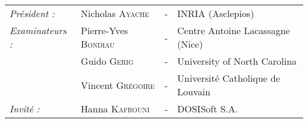 \begin{titlepage}
\begin{center}
\begin{tabular}{llcl}
      \textit{Président :}	& Nicholas \textsc{Ayache}		& - & INRIA (Asclepios)\\
      \textit{Examinateurs :}   & Pierre-Yves \textsc{Bondiau}          & - & Centre Antoine Lacassagne (Nice)\\
      				& Guido \textsc{Gerig}			& - & University of North Carolina\\
      				& Vincent \textsc{Grégoire}		& - & Université Catholique de Louvain\\
      \textit{Invité :}		& Hanna \textsc{Kafrouni}		& - & DOSISoft S.A.
\end{tabular}
\end{center}
\end{titlepage}
\sloppy

\titlepage
